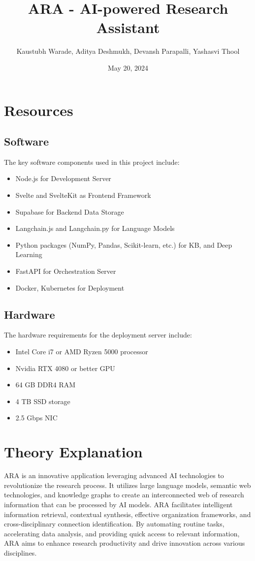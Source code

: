 \documentclass{article}
\title{ARA - AI-powered Research Assistant}
\author{Kaustubh Warade, Aditya Deshmukh, Devansh Parapalli, Yashasvi Thool}
\date{May 20, 2024}
\begin{document}
\maketitle

\section*{Resources}
\subsection*{Software}
The key software components used in this project include:
\begin{itemize}
    \item Node.js for Development Server
    \item Svelte and SvelteKit as Frontend Framework
    \item Supabase for Backend Data Storage
    \item Langchain.js and Langchain.py for Language Models
    \item Python packages (NumPy, Pandas, Scikit-learn, etc.) for KB, and Deep Learning
    \item FastAPI for Orchestration Server
    \item Docker, Kubernetes for Deployment
\end{itemize}

\subsection*{Hardware}
The hardware requirements for the deployment server include:
\begin{itemize}
    \item Intel Core i7 or AMD Ryzen 5000 processor
    \item Nvidia RTX 4080 or better GPU
    \item 64 GB DDR4 RAM
    \item 4 TB SSD storage
    \item 2.5 Gbps NIC
\end{itemize}

\section*{Theory Explanation}
ARA is an innovative application leveraging advanced AI technologies to revolutionize the research process. It utilizes large language models, semantic web technologies, and knowledge graphs to create an interconnected web of research information that can be processed by AI models. ARA facilitates intelligent information retrieval, contextual synthesis, effective organization frameworks, and cross-disciplinary connection identification. By automating routine tasks, accelerating data analysis, and providing quick access to relevant information, ARA aims to enhance research productivity and drive innovation across various disciplines.
\end{document}
